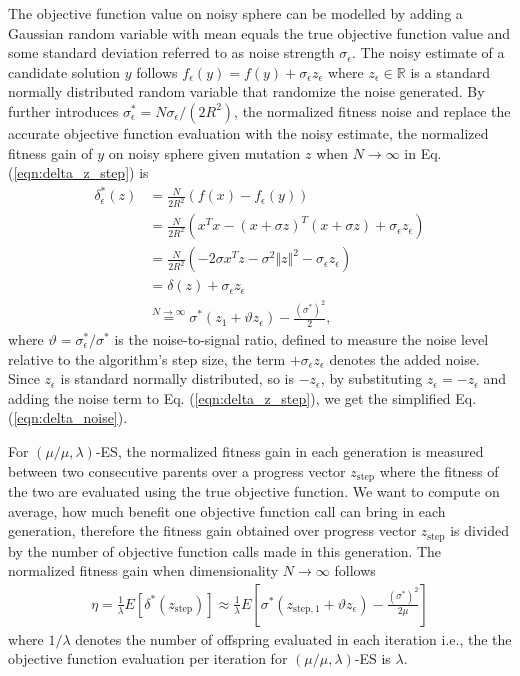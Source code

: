 The objective function value on noisy sphere can be modelled by adding a Gaussian random variable with mean equals the true objective function value and some standard deviation referred to as noise strength $\sigma_\epsilon$. The noisy estimate of a candidate solution $y$ follows $f_{\epsilon}(y) = f(y) + \sigma_{\epsilon} z_\epsilon$ where $z_\epsilon \in \mathbb{R}$ is a standard normally distributed random variable that randomize the noise generated. By further introduces $\sigma_\epsilon^* = N \sigma_\epsilon / (2R^2)$, the normalized fitness noise \cite{1284729} and replace the accurate objective function evaluation with the noisy estimate, the normalized fitness gain of $y$ on noisy sphere given mutation $z$ when $N \rightarrow \infty$ in Eq. (\ref{eqn:delta_z_step}) is
\begin{align}
\delta_\epsilon^* (z)
&=  \frac{N}{2R^2}\left( f(x) - f_\epsilon(y)\right)  \nonumber\\ 
& = \frac{N}{2R^2} (x^Tx - (x+\sigma z)^T (x+\sigma z) +\sigma_\epsilon z_\epsilon) \nonumber\\
& = \frac{N}{2R^2} (-2 \sigma x^Tz - \sigma^2 \Vert z\Vert^2 -\sigma_\epsilon z_\epsilon) \nonumber\\
& = \delta(z) + \sigma_\epsilon z_\epsilon\nonumber\\
&\overset{N \rightarrow \infty}{=} \sigma^* (z_1 + \vartheta z_\epsilon ) - \frac{(\sigma^*)^2}{2}, \label{eqn:delta_noise}{}
\end{align}
where $\vartheta = \sigma_\epsilon^*/\sigma^*$ is the noise-to-signal ratio, defined to measure the noise level relative to the algorithm's step size, the term $+\sigma_\epsilon z_\epsilon$ denotes the added noise. Since $z_\epsilon$ is standard normally distributed, so is $-z_\epsilon$, by substituting $z_\epsilon = -z_\epsilon$ and adding the noise term to Eq. (\ref{eqn:delta_z_step}), we get the simplified Eq. (\ref{eqn:delta_noise}).

For $(\mu/\mu,\lambda)$-ES, the normalized fitness gain in each generation is measured between two consecutive parents over a progress vector $z_{\text{step}}$ where the fitness of the two are evaluated using the true objective function. We want to compute on average, how much benefit one objective function call can bring in each generation, therefore the fitness gain obtained over progress vector $z_{\text{step}}$ is divided by the number of objective function calls made in this generation. The normalized fitness gain when dimensionality $N \rightarrow \infty$ follows 
\begin{align}\label{eqn:eta_noise_sphere_raw}{}
\eta = \frac{1}{\lambda}E[ \delta^*(z_{\text{step}})] \approx \frac{1}{\lambda} E \left[ \sigma^* (z_{\text{step},1} + \vartheta z_\epsilon ) - \frac{(\sigma^*)^2}{2\mu}  \right]
\end{align}
where $1/\lambda$ denotes the number of offspring evaluated in each iteration i.e., the the objective function evaluation per iteration for $(\mu/\mu,\lambda)$-ES is $\lambda$.

